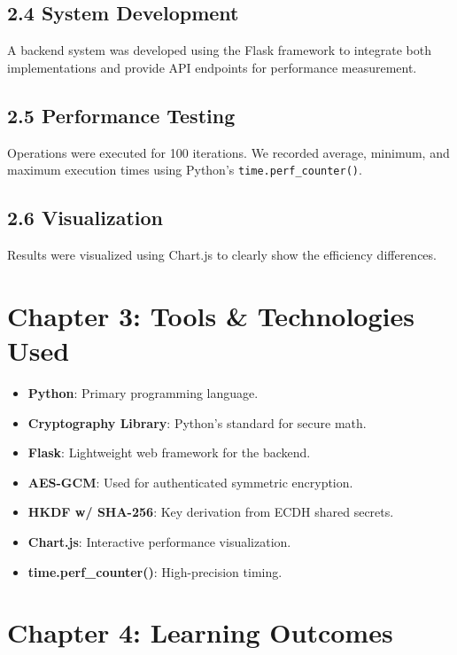 \documentclass[12pt, a4paper]{report}
\begin{document}
\section{2.4 System Development}
A backend system was developed using the Flask framework to integrate both implementations and provide API endpoints for performance measurement.

\section{2.5 Performance Testing}
Operations were executed for 100 iterations. We recorded average, minimum, and maximum execution times using Python's \texttt{time.perf\_counter()}.

\section{2.6 Visualization}
Results were visualized using Chart.js to clearly show the efficiency differences.

\chapter*{Chapter 3: Tools & Technologies Used}

\begin{itemize}[leftmargin=2em]
  \item \textbf{Python}: Primary programming language.
  \item \textbf{Cryptography Library}: Python's standard for secure math.
  \item \textbf{Flask}: Lightweight web framework for the backend.
  \item \textbf{AES-GCM}: Used for authenticated symmetric encryption.
  \item \textbf{HKDF w/ SHA-256}: Key derivation from ECDH shared secrets.
  \item \textbf{Chart.js}: Interactive performance visualization.
  \item \textbf{time.perf\_counter()}: High-precision timing.
\end{itemize}

\chapter*{Chapter 4: Learning Outcomes}
\end{document}
